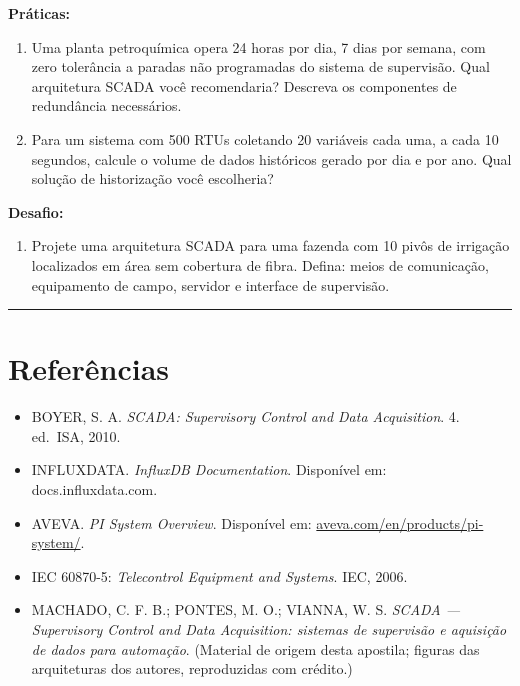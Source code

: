 \textbf{Práticas:}

\begin{enumerate}
\def\labelenumi{\arabic{enumi}.}
\setcounter{enumi}{3}
\tightlist
\item
  Uma planta petroquímica opera 24 horas por dia, 7 dias por semana, com zero tolerância a paradas não programadas do sistema de supervisão. Qual arquitetura SCADA você recomendaria? Descreva os componentes de redundância necessários.
\item
  Para um sistema com 500 RTUs coletando 20 variáveis cada uma, a cada 10 segundos, calcule o volume de dados históricos gerado por dia e por ano. Qual solução de historização você escolheria?
\end{enumerate}

\textbf{Desafio:}

\begin{enumerate}
\def\labelenumi{\arabic{enumi}.}
\setcounter{enumi}{5}
\tightlist
\item
  Projete uma arquitetura SCADA para uma fazenda com 10 pivôs de irrigação localizados em área sem cobertura de fibra. Defina: meios de comunicação, equipamento de campo, servidor e interface de supervisão.
\end{enumerate}

\begin{center}\rule{0.5\linewidth}{0.5pt}\end{center}

\section{Referências}\label{referuxeancias}

\begin{itemize}
\tightlist
\item
  BOYER, S. A. \emph{SCADA: Supervisory Control and Data Acquisition}. 4. ed.~ISA, 2010.
\item
  INFLUXDATA. \emph{InfluxDB Documentation}. Disponível em: docs.influxdata.com.
\item
  AVEVA. \emph{PI System Overview}. Disponível em: \url{aveva.com/en/products/pi-system/}.
\item
  IEC 60870-5: \emph{Telecontrol Equipment and Systems}. IEC, 2006.
\item
  MACHADO, C. F. B.; PONTES, M. O.; VIANNA, W. S. \emph{SCADA --- Supervisory Control and Data
  Acquisition: sistemas de supervisão e aquisição de dados para automação}. (Material de origem desta
  apostila; figuras das arquiteturas dos autores, reproduzidas com crédito.)
\end{itemize}
